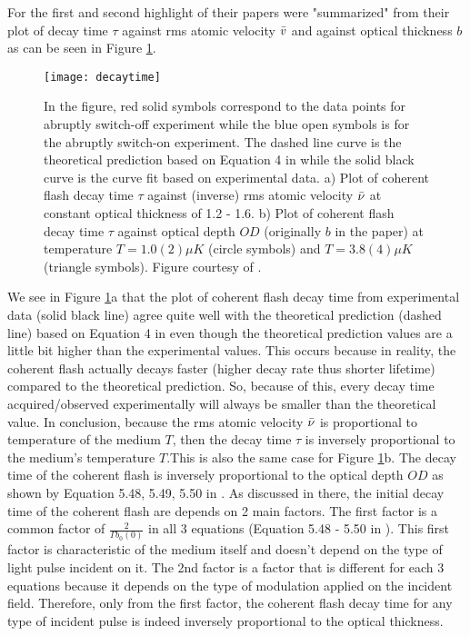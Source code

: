 For the first and second highlight of their papers were "summarized" from their plot of decay time $\tau$ against rms atomic velocity $\Bar{v}$ and against optical thickness $b$ as can be seen in Figure \ref{fig: decay time}. 

\begin{figure}[h!]
    \centering
    \texttt{[image: decaytime]}
    \caption{In the figure, red solid symbols correspond to the data points for abruptly switch-off experiment while the blue open symbols is for the abruptly switch-on experiment. The dashed line curve is the theoretical prediction based on Equation 4 in \cite{Chalony2011} while the solid black curve is the curve fit based on experimental data. a) Plot of coherent flash decay time $\tau$ against (inverse) rms atomic velocity $\Bar{\nu}$ at constant optical thickness of 1.2 - 1.6. b) Plot of coherent flash decay time $\tau$ against optical depth $OD$ (originally $b$ in the paper) at temperature  $T = 1.0(2) \mu K$ (circle symbols) and $T = 3.8(4) \mu K$ (triangle symbols). Figure courtesy of \cite{Chalony2011}.}
    \label{fig: decay time}
\end{figure}

We see in Figure \ref{fig: decay time}a that the plot of coherent flash decay time from experimental data (solid black line) agree quite well with the theoretical prediction (dashed line) based on Equation 4 in \cite{Chalony2011} even though the theoretical prediction values are a little bit higher than the experimental values. This occurs because in reality, the coherent flash actually decays faster (higher decay rate thus shorter lifetime) compared to the theoretical prediction. So, because of this, every decay time acquired/observed experimentally will always be smaller than the theoretical value. In conclusion, because the rms atomic velocity $\Bar{\nu}$ is proportional to temperature of the medium $T$, then the decay time $\tau$ is inversely proportional to the medium's temperature $T$.This is also the same case for Figure \ref{fig: decay time}b. The decay time of the coherent flash is inversely proportional to the optical depth $OD$ as shown by Equation 5.48, 5.49, 5.50 in \cite{Kwong2017}. As discussed in there, the initial decay time of the coherent flash are depends on 2 main factors. The first factor is a common factor of $\frac{2}{\Gamma b_{0}(0)}$ in all 3 equations (Equation 5.48 - 5.50 in \cite{Kwong2017}). This first factor is characteristic of the medium itself and doesn't depend on the type of light pulse incident on it. The 2nd factor is a factor that is different for each 3 equations because it depends on the type of modulation applied on the incident field. Therefore, only from the first factor, the coherent flash decay time for any type of incident pulse is indeed inversely proportional to the optical thickness.\\

